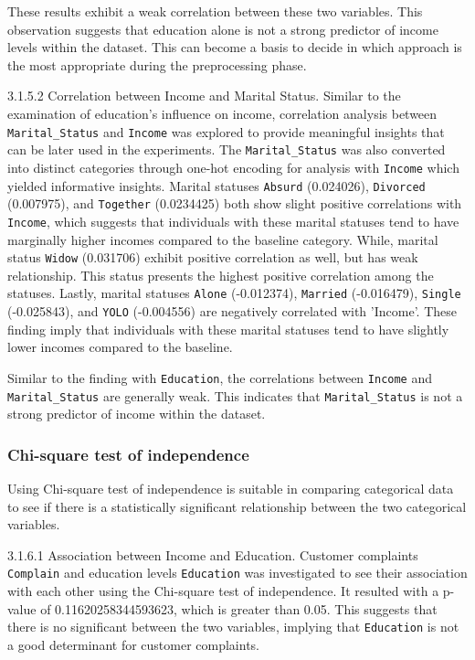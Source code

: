     These results exhibit a weak correlation between these two variables. This observation suggests that education alone is not a strong predictor of income levels within the dataset. This can become a basis to decide in which approach is the most appropriate during the preprocessing phase.

    3.1.5.2 Correlation between Income and Marital Status. Similar to the examination of education's influence on income, correlation analysis between \texttt{Marital\_Status} and \texttt{Income} was explored to provide meaningful insights that can be later used in the experiments. The \texttt{Marital\_Status} was also converted into distinct categories through one-hot encoding for analysis with \texttt{Income} which yielded informative insights. Marital statuses \texttt{Absurd} (0.024026), \texttt{Divorced} (0.007975), and \texttt{Together} (0.0234425) both show slight positive correlations with \texttt{Income}, which suggests that individuals with these marital statuses tend to have marginally higher incomes compared to the baseline category. While, marital status \texttt{Widow} (0.031706) exhibit positive correlation as well, but has weak relationship. This status presents the highest positive correlation among the statuses. Lastly, marital statuses \texttt{Alone} (-0.012374), \texttt{Married} (-0.016479), \texttt{Single} (-0.025843), and \texttt{YOLO} (-0.004556) are negatively correlated with 'Income'. These finding imply that individuals with these marital statuses tend to have slightly lower incomes compared to the baseline.

    Similar to the finding with \texttt{Education}, the correlations between \texttt{Income} and \texttt{Marital\_Status} are generally weak. This indicates that \texttt{Marital\_Status} is not a strong predictor of income within the dataset.

\subsubsection{Chi-square test of independence}

Using Chi-square test of independence is suitable in comparing categorical data to see if there is a statistically significant relationship between the two categorical variables.

    3.1.6.1 Association between Income and Education. Customer complaints \texttt{Complain} and education levels \texttt{Education} was investigated to see their association with each other using the Chi-square test of independence. It resulted with a p-value of 0.11620258344593623, which is greater than 0.05. This suggests that there is no significant between the two variables, implying that \texttt{Education} is not a good determinant for customer complaints.

